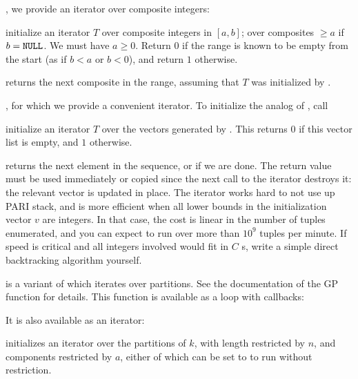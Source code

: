 \item {}, we provide an iterator over composite integers:

 initialize an
iterator $T$ over composite integers in $[a,b]$; over composites $\geq a$ if
$b = {\tt NULL}$. We must have $a\geq 0$. Return $0$ if the range is known to
be empty from the start (as if $b < a$ or $b < 0$), and return $1$ otherwise.

 returns the next composite in
the range, assuming that $T$ was initialized by .

\item {}, for which we provide a convenient iterator. To
initialize the analog of , call

initialize an iterator $T$ over the vectors generated by
. This returns $0$ if this vector list is
empty, and $1$ otherwise.

 returns the next element in the
 sequence, or  if we are done. The return value must be
used immediately or copied since the next call to the iterator destroys it:
the relevant vector is updated in place. The iterator works hard to not
use up PARI stack, and is more efficient when all lower bounds in the
initialization vector $v$ are integers. In that case, the cost is linear in
the number of tuples enumerated, and you can expect to run over more than
$10^9$ tuples per minute. If speed is critical and all integers involved
would fit in $C$ s, write a simple direct backtracking algorithm
yourself.

\item {} is a variant of  which iterates over
  partitions. See the documentation of the  GP function for
  details. This function is available as a loop with callbacks:


  \noindent It is also available as an iterator:

   initializes an
  iterator over the partitions of $k$, with length restricted by $n$,
  and components restricted by $a$, either of which can be set to 
  to run without restriction.

